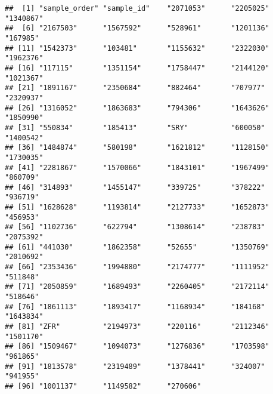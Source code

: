\documentclass[
]{article}
\newenvironment{Shaded}{\begin{snugshade}}{\end{snugshade}}
\newcommand{\CommentTok}[1]{\textcolor[rgb]{0.56,0.35,0.01}{\textit{#1}}}
\newcommand{\ControlFlowTok}[1]{\textcolor[rgb]{0.13,0.29,0.53}{\textbf{#1}}}
\newcommand{\DataTypeTok}[1]{\textcolor[rgb]{0.13,0.29,0.53}{#1}}
\newcommand{\DecValTok}[1]{\textcolor[rgb]{0.00,0.00,0.81}{#1}}
\newcommand{\KeywordTok}[1]{\textcolor[rgb]{0.13,0.29,0.53}{\textbf{#1}}}
\newcommand{\NormalTok}[1]{#1}
\newcommand{\OperatorTok}[1]{\textcolor[rgb]{0.81,0.36,0.00}{\textbf{#1}}}
\newcommand{\StringTok}[1]{\textcolor[rgb]{0.31,0.60,0.02}{#1}}
\begin{document}
\begin{Shaded}
\end{Shaded}

\begin{verbatim}
##  [1] "sample_order" "sample_id"    "2071053"      "2205025"      "1340867"     
##  [6] "2167503"      "1567592"      "528961"       "1201136"      "167985"      
## [11] "1542373"      "103481"       "1155632"      "2322030"      "1962376"     
## [16] "117115"       "1351154"      "1758447"      "2144120"      "1021367"     
## [21] "1891167"      "2350684"      "882464"       "707977"       "2320937"     
## [26] "1316052"      "1863683"      "794306"       "1643626"      "1850990"     
## [31] "550834"       "185413"       "SRY"          "600050"       "1400542"     
## [36] "1484874"      "580198"       "1621812"      "1128150"      "1730035"     
## [41] "2281867"      "1570066"      "1843101"      "1967499"      "860709"      
## [46] "314893"       "1455147"      "339725"       "378222"       "936719"      
## [51] "1628628"      "1193814"      "2127733"      "1652873"      "456953"      
## [56] "1102736"      "622794"       "1308614"      "238783"       "2075392"     
## [61] "441030"       "1862358"      "52655"        "1350769"      "2010692"     
## [66] "2353436"      "1994880"      "2174777"      "1111952"      "511848"      
## [71] "2050859"      "1689493"      "2260405"      "2172114"      "518646"      
## [76] "1861113"      "1893417"      "1168934"      "184168"       "1643834"     
## [81] "ZFR"          "2194973"      "220116"       "2112346"      "1501170"     
## [86] "1509467"      "1094073"      "1276836"      "1703598"      "961865"      
## [91] "1813578"      "2319489"      "1378441"      "324007"       "941955"      
## [96] "1001137"      "1149582"      "270606"
\end{verbatim}
\end{document}
